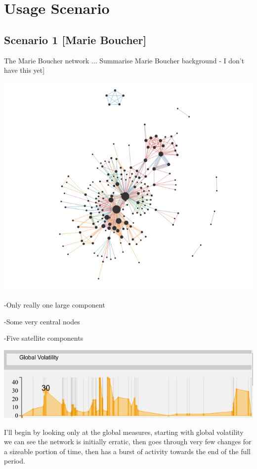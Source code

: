 
\chapter{Usage Scenario}

\section{Scenario 1 [Marie Boucher]}
The Marie Boucher network \cite{dufournaud2017analyse}...
Summarise Marie Boucher background - I don't have this yet]

\begin{center}
\includegraphics[trim={0 0 0 0}, width=140mm]{./Figures/marieBoucherFull.png}
\end{center}

-Only really one large component

-Some very central nodes

-Five satellite components

\begin{center}
\includegraphics[trim={0 0 0 0}, width=140mm]{./Figures/marieBoucherGlobalVolatility.png}
\end{center}
I'll begin by looking only at the global measures, starting with global volatility we can see the network is initially erratic, then goes through very few changes for a sizeable portion of time, then has a burst of activity towards the end of the full period. 

